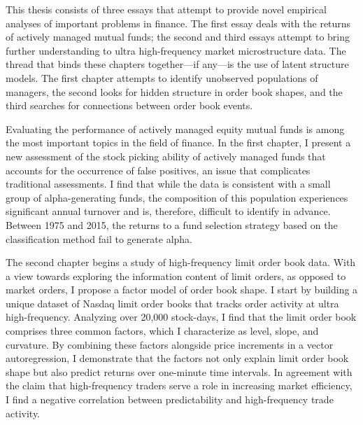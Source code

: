 This thesis consists of three essays that attempt to provide novel empirical analyses of important problems in finance. The first essay deals with the returns of actively managed mutual funds; the second and third essays attempt to bring further understanding to ultra high-frequency market microstructure data. The thread that binds these chapters together---if any---is the use of latent structure models. The first chapter attempts to identify unobserved populations of managers, the second looks for hidden structure in order book shapes, and the third searches for connections between order book events. 

Evaluating the performance of actively managed equity mutual funds is among the most important topics in the field of finance. In the first chapter, I present a new assessment of the stock picking ability of actively managed funds that accounts for the occurrence of false positives, an issue that complicates traditional assessments. I find that while the data is consistent with a small group of alpha-generating funds, the composition of this population experiences significant annual turnover and is, therefore, difficult to identify in advance. Between 1975 and 2015, the returns to a fund selection strategy based on the classification method fail to generate alpha.

The second chapter begins a study of high-frequency limit order book data. With a view towards exploring the information content of limit orders, as opposed to market orders, I propose a factor model of order book shape. I start by building a unique dataset of Nasdaq limit order books that tracks order activity at ultra high-frequency. Analyzing over 20,000 stock-days, I find that the limit order book comprises three common factors, which I characterize as level, slope, and curvature. By combining these factors alongside price increments in a vector autoregression, I demonstrate that the factors not only explain limit order book shape but also predict returns over one-minute time intervals. In agreement with the claim that high-frequency traders serve a role in increasing market efficiency, I find a negative correlation between predictability and high-frequency trade activity.

